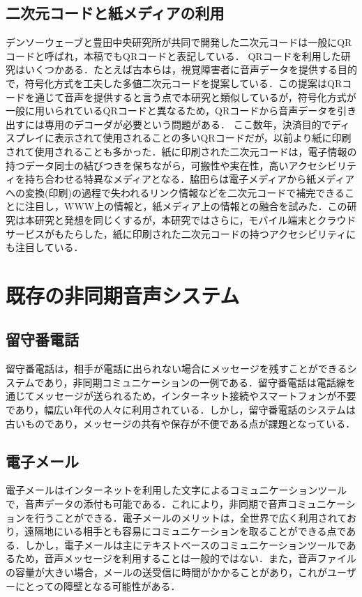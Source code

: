 \documentclass[submit,techrep,noauthor]{ipsj}
\begin{document}
\subsection{二次元コードと紙メディアの利用}
デンソーウェーブと豊田中央研究所が共同で開発した二次元コード\cite{qr-patent}は一般にQRコード\cite{qr-jis}と呼ばれ，本稿でもQRコードと表記している．
QRコードを利用した研究はいくつかある．たとえば古本ら\cite{qr-1}は，視覚障害者に音声データを提供する目的で，符号化方式を工夫した多値二次元コードを提案している．この提案はQRコードを通じて音声を提供すると言う点で本研究と類似しているが，符号化方式が一般に用いられているQRコードと異なるため，QRコードから音声データを引き出すには専用のデコーダが必要という問題がある．
ここ数年，決済目的でディスプレイに表示されて使用されることの多い\cite{white_paper_infor_commun_japan-2}QRコードだが，以前より紙に印刷されて使用されることも多かった．紙に印刷された二次元コードは，電子情報の持つデータ同士の結びつきを保ちながら，可搬性や実在性，高いアクセシビリティを持ち合わせる特異なメディアとなる．脇田ら\cite{qr-2}は電子メディアから紙メディアへの変換(印刷)の過程で失われるリンク情報などを二次元コードで補完できることに注目し，WWW上の情報と，紙メディア上の情報との融合を試みた．この研究は本研究と発想を同じくするが，本研究ではさらに，モバイル端末とクラウドサービスがもたらした，紙に印刷された二次元コードの持つアクセシビリティにも注目している．

\section{既存の非同期音声システム}

\subsection{留守番電話}
留守番電話は，相手が電話に出られない場合にメッセージを残すことができるシステムであり，非同期コミュニケーションの一例である．留守番電話は電話線を通じてメッセージが送られるため，インターネット接続やスマートフォンが不要であり，幅広い年代の人々に利用されている．しかし，留守番電話のシステムは古いものであり，メッセージの共有や保存が不便である点が課題となっている．

\subsection{電子メール}
電子メールはインターネットを利用した文字によるコミュニケーションツールで，音声データの添付も可能である．これにより，非同期で音声コミュニケーションを行うことができる．電子メールのメリットは，全世界で広く利用されており，遠隔地にいる相手とも容易にコミュニケーションを取ることができる点である．しかし，電子メールは主にテキストベースのコミュニケーションツールであるため，音声メッセージを利用することは一般的ではない．また，音声ファイルの容量が大きい場合，メールの送受信に時間がかかることがあり，これがユーザーにとっての障壁となる可能性がある．
\end{document}

